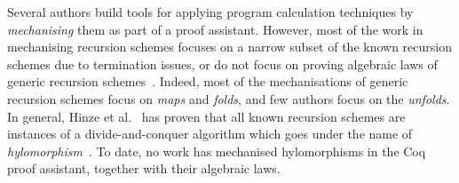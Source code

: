 \documentclass{llncs}
\begin{document}
Several authors build tools for applying program calculation techniques by
\emph{mechanising} them as part of a proof assistant. However, most of the work
in mechanising recursion schemes focuses on a narrow subset of the known
recursion schemes due to termination issues, or do not focus on proving
algebraic laws of generic recursion schemes~\cite{10.1007/978-3-642-17796-5_10,MurataE19,larchey2022braga}.
Indeed, most of the mechanisations of generic
recursion schemes focus on \emph{maps} and \emph{folds}, and few authors focus
on the \emph{unfolds}. In general, Hinze et al.~\cite{HinzeWG15} has proven that
all known  recursion schemes are instances of a  divide-and-conquer algorithm
which goes under the name of \emph{hylomorphism}~\cite{MeijerFP91,HuIT96}.  To
date, no work has mechanised hylomorphisms in the Coq proof assistant, together
with their algebraic laws.
\end{document}
